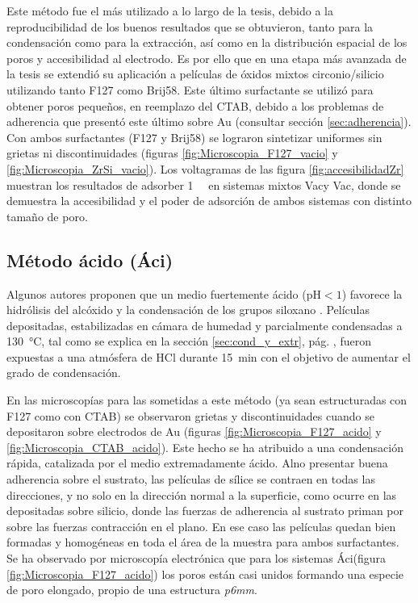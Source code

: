 		 Este método fue el más utilizado a lo largo de la tesis, debido a la reproducibilidad de los buenos resultados que se obtuvieron, tanto para la condensación como para la extracción, así como en la distribución espacial de los poros y accesibilidad al electrodo. Es por ello que en una etapa más avanzada de la tesis se extendió su aplicación a películas de óxidos mixtos circonio/silicio utilizando tanto F127 como Brij58. Este último surfactante se utilizó para obtener poros pequeños, en reemplazo del CTAB, debido a los problemas de adherencia que presentó este último sobre Au (consultar sección \ref{sec:adherencia}). Con ambos surfactantes (F127 y Brij58) se lograron sintetizar \pdm\space uniformes sin grietas ni discontinuidades (figuras \ref{fig:Microscopia_F127_vacio} y \ref{fig:Microscopia_ZrSi_vacio}). Los voltagramas de las figura \ref{fig:accesibilidadZr} muestran los resultados de adsorber \aminorutenio\space \SI{1}{\milli\Molar} en sistemas mixtos Vac\pdmZ\space y Vac\pdmZB, donde se demuestra la accesibilidad y el poder de adsorción de ambos sistemas con distinto tamaño de poro.

	 \subsection{Método ácido (Áci)}

	 	 Algunos autores proponen que un medio fuertemente ácido (pH$<1$) favorece la hidrólisis del alcóxido y la condensación de los grupos siloxano \cite{Soler-Illia2011,Doshi2000a,Huo1996,Boissiere2000,Beck1992}. Películas depositadas, estabilizadas en cámara de humedad y parcialmente condensadas a \SI{130}{\celsius}, tal como se explica en la sección \ref{sec:cond_y_extr}, pág. \pageref{sec:cond_y_extr}, fueron expuestas a una atmósfera de HCl durante \SI{15}{\minute} con el objetivo de aumentar el grado de condensación. 

		 En las microscopías para las \pdm\space sometidas a este método (ya sean estructuradas con F127 como con CTAB) se observaron grietas y discontinuidades cuando se depositaron sobre electrodos de Au (figuras \ref{fig:Microscopia_F127_acido} y \ref{fig:Microscopia_CTAB_acido}). Este hecho se ha atribuido a una condensación rápida, catalizada por el medio extremadamente ácido. Al\space no presentar buena adherencia sobre el sustrato, las películas de sílice se contraen en todas las direcciones, y no solo en la dirección normal a la superficie, como ocurre en las \pdm\space depositadas sobre silicio, donde las fuerzas de adherencia al sustrato priman por sobre las fuerzas contracción en el plano\cite{Sakatani2006,Boissiere2005,Guillemin2010}. En ese caso las películas quedan bien formadas y homogéneas en toda el área de la muestra para ambos surfactantes. Se ha observado por microscopía electrónica que para los sistemas Áci\pdmF\space (figura \ref{fig:Microscopia_F127_acido}) los  poros están casi unidos formando una especie de poro elongado, propio de una estructura \textit{p6mm}\cite{GonzalezSolveyra2017}. 
	
